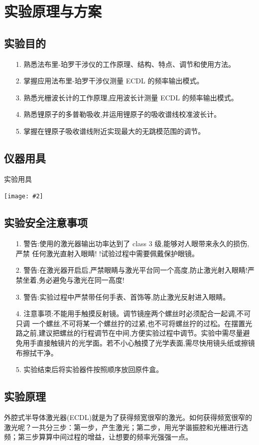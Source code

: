 \documentclass[10pt,a4paper]{ctexart}
\newcommand{\cpic}[2]{
\begin{center}
\texttt{[image: \#2]}
\end{center}
}
\begin{document}
\section{实验原理与方案}
\subsection{实验目的}
\begin{enumerate}
 \item[1.] 熟悉法布里-珀罗干涉仪的工作原理、结构、特点、调节和使用方法。
  \item[2.] 掌握应用法布里-珀罗干涉仪测量 ECDL 的频率输出模式。
\item[3.] 熟悉光栅波长计的工作原理,应用波长计测量 ECDL 的频率输出模式。
\item[4.] 熟悉锂原子的多普勒吸收,并运用锂原子的吸收谱线校准波长计。
\item[5.] 掌握在锂原子吸收谱线附近实现最大的无跳模范围的调节。
\end{enumerate}


\subsection{仪器用具}
\begin{table}[H]
  \caption{实验用具}
\cpic{0.4}{t1}
\end{table}

\subsection{实验安全注意事项}
\begin{enumerate}
\item[1.] 警告:使用的激光器输出功率达到了 class 3 级,能够对人眼带来永久的损伤,严禁
任何激光直射入眼睛!
!试验过程中需要佩戴保护眼镜。
\item[2.] 警告:在激光器开启后,严禁眼睛与激光平台同一个高度,防止激光射入眼睛!严
禁坐着,务必避免与激光在同一高度!
\item[3.] 警告:实验过程中严禁带任何手表、首饰等,防止激光反射进入眼睛。
\item[4.] 注意事项:不能用手触摸反射镜。调节镜座两个螺丝时必须配合一起调,不可只调
一个螺丝,不可将某一个螺丝拧的过紧,也不可将螺丝拧的过松。在摆置光路之前,建议把螺丝的行程调节在中间,方便实验过程中调节。实验中需尽量避免用手直接触镜片的光学面。若不小心触摸了光学表面,需尽快用镜头纸或擦镜布擦拭干净。
\item[5.]实验结束后将实验器件按照顺序放回原件盒。
\end{enumerate}
\subsection{实验原理}
外腔式半导体激光器(ECDL)就是为了获得频宽很窄的激光。如何获得频宽很窄的激光呢？一共分三步：第一步，产生激光；第二步，用光学谐振腔和光栅进行选频；第三步算算中间过程的增益，让想要的频率光强强一点。
\end{document}
